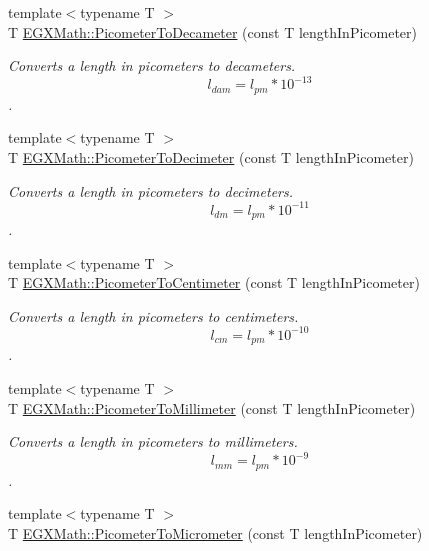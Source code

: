 \begin{DoxyCompactItemize}
{\footnotesize template$<$typename T $>$ }\\T \mbox{\hyperlink{group___e_g_x_math-_conversions-_length_conversions-_s_i-_picometer-_s_i_gac3123f93cc73d11cefa26073dc2c46a5}{E\+G\+X\+Math\+::\+Picometer\+To\+Decameter}} (const T length\+In\+Picometer)
\begin{DoxyCompactList}\small\item\em Converts a length in picometers to decameters. \[ l_{dam}=l_{pm} * 10^{-13} \]. \end{DoxyCompactList}\item 
{\footnotesize template$<$typename T $>$ }\\T \mbox{\hyperlink{group___e_g_x_math-_conversions-_length_conversions-_s_i-_picometer-_s_i_gab0d70362fb21996562efb9c22d9bacf4}{E\+G\+X\+Math\+::\+Picometer\+To\+Decimeter}} (const T length\+In\+Picometer)
\begin{DoxyCompactList}\small\item\em Converts a length in picometers to decimeters. \[ l_{dm}=l_{pm} * 10^{-11} \]. \end{DoxyCompactList}\item 
{\footnotesize template$<$typename T $>$ }\\T \mbox{\hyperlink{group___e_g_x_math-_conversions-_length_conversions-_s_i-_picometer-_s_i_gabb7609315d88da8dd25575caf15a5e06}{E\+G\+X\+Math\+::\+Picometer\+To\+Centimeter}} (const T length\+In\+Picometer)
\begin{DoxyCompactList}\small\item\em Converts a length in picometers to centimeters. \[ l_{cm}=l_{pm} * 10^{-10} \]. \end{DoxyCompactList}\item 
{\footnotesize template$<$typename T $>$ }\\T \mbox{\hyperlink{group___e_g_x_math-_conversions-_length_conversions-_s_i-_picometer-_s_i_gac6c5e481bf86b5c0d2ed7fa6a06a4c8e}{E\+G\+X\+Math\+::\+Picometer\+To\+Millimeter}} (const T length\+In\+Picometer)
\begin{DoxyCompactList}\small\item\em Converts a length in picometers to millimeters. \[ l_{mm}=l_{pm} * 10^{-9} \]. \end{DoxyCompactList}\item 
{\footnotesize template$<$typename T $>$ }\\T \mbox{\hyperlink{group___e_g_x_math-_conversions-_length_conversions-_s_i-_picometer-_s_i_gacf7ccbf7130894f8a9075cb9fd66c67d}{E\+G\+X\+Math\+::\+Picometer\+To\+Micrometer}} (const T length\+In\+Picometer)

\end{DoxyCompactItemize}
